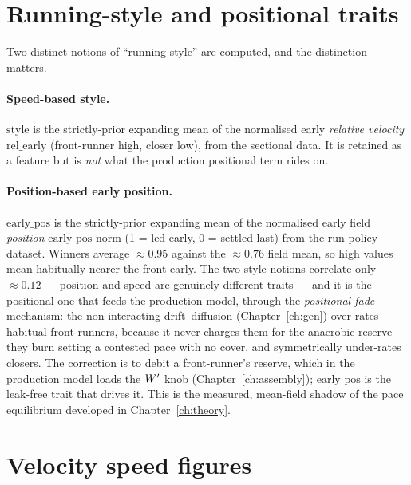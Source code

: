 \section{Running-style and positional traits}

Two distinct notions of ``running style'' are computed, and the distinction matters.

\paragraph{Speed-based style.} $\mathrm{style}$ is the strictly-prior expanding mean of the
normalised early \emph{relative velocity} $\mathrm{rel\_early}$ (front-runner high, closer low),
from the sectional data. It is retained as a feature but is \emph{not} what the production
positional term rides on.

\paragraph{Position-based early position.} $\mathrm{early\_pos}$ is the strictly-prior expanding
mean of the normalised early field \emph{position} $\mathrm{early\_pos\_norm}$ (1 = led early, 0 =
settled last) from the run-policy dataset. Winners average $\approx 0.95$ against the
$\approx 0.76$ field mean, so high values mean habitually nearer the front early. The two style
notions correlate only $\approx 0.12$ --- position and speed are genuinely different traits ---
and it is the positional one that feeds the production model, through the \emph{positional-fade}
mechanism: the non-interacting drift--diffusion (Chapter~\ref{ch:gen}) over-rates habitual
front-runners, because it never charges them for the anaerobic reserve they burn setting a
contested pace with no cover, and symmetrically under-rates closers. The correction is to debit a
front-runner's reserve, which in the production model loads the ${W^{\prime}}$ knob
(Chapter~\ref{ch:assembly}); $\mathrm{early\_pos}$ is the leak-free trait that drives it. This is
the measured, mean-field shadow of the pace equilibrium developed in Chapter~\ref{ch:theory}.

\section{Velocity speed figures}

